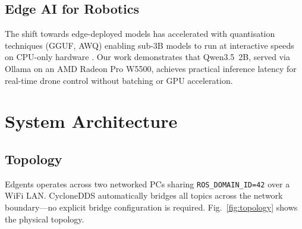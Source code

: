 \documentclass[conference]{IEEEtran}
\begin{document}
\subsection{Edge AI for Robotics}

The shift towards edge-deployed models has accelerated with quantisation techniques (GGUF, AWQ) enabling sub-3B models to run at interactive speeds on CPU-only hardware \cite{ref_ollama}. Our work demonstrates that Qwen3.5~2B, served via Ollama on an AMD Radeon Pro W5500, achieves practical inference latency for real-time drone control without batching or GPU acceleration.

\section{System Architecture}
\label{sec:architecture}

\subsection{Topology}

Edgents operates across two networked PCs sharing \texttt{ROS\_DOMAIN\_ID=42} over a WiFi LAN. CycloneDDS automatically bridges all topics across the network boundary—no explicit bridge configuration is required. Fig.~\ref{fig:topology} shows the physical topology.
\end{document}
